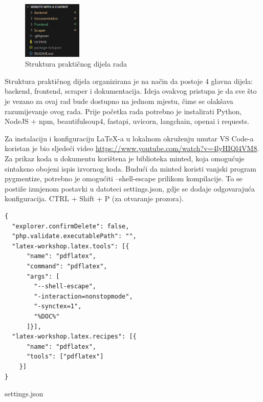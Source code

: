 \documentclass[]{foi}
\begin{document}
\begin{figure}[ht!]
    \centering
    \includegraphics[width=0.25\textwidth]{./assets/Structure-main.png} 
    \caption{Struktura praktičnog dijela rada}
    \label{fig:slika180}
\end{figure}

Struktura praktičnog dijela organizirana je na način da postoje 4 glavna dijela: backend, frontend, scraper i dokumentacija. Ideja ovakvog
pristupa je da sve što je vezano za ovaj rad bude dostupno na jednom mjestu, čime se olakšava razumijevanje ovog rada. Prije početka rada potrebno je instalirati Python, NodeJS + npm, beautifulsoup4, fastapi, uvicorn, langchain, openai i requests.

Za instalaciju i konfiguraciju LaTeX-a u lokalnom okruženju unutar VS Code-a koristan je bio sljedeći video \url{https://www.youtube.com/watch?v=4lyHIQl4VM8}. Za prikaz koda u dokumentu
korištena je biblioteka minted, koja omogućuje sintaksno obojeni ispis izvornog koda. Budući da minted koristi vanjski program pygmentize, potrebno je omogućiti --shell-escape prilikom 
kompilacije. To se postiže izmjenom postavki u datoteci settings.json, gdje se dodaje odgovarajuća konfiguracija. CTRL + Shift + P (za otvaranje prozora).

\begin{longlisting}
\begin{verbatim}
{
  "explorer.confirmDelete": false,
  "php.validate.executablePath": "",
  "latex-workshop.latex.tools": [{
      "name": "pdflatex",
      "command": "pdflatex",
      "args": [
        "--shell-escape",
        "-interaction=nonstopmode",
        "-synctex=1",
        "%DOC%"
      ]}],
  "latex-workshop.latex.recipes": [{
      "name": "pdflatex",
      "tools": ["pdflatex"]
    }]
}
\end{verbatim}
\caption{settings.json}
\label{lst:settings}
\end{longlisting}

\newpage
\end{document}
